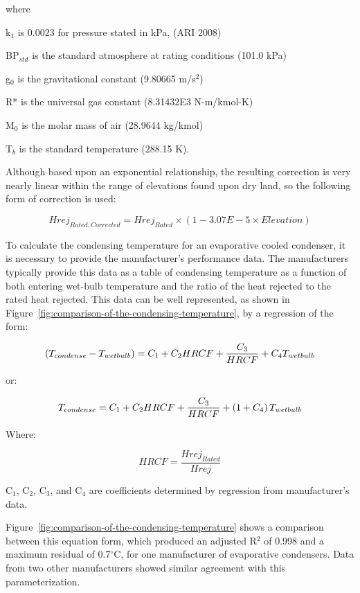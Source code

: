 where

k\(_{1}\) is 0.0023 for pressure stated in kPa, (ARI 2008)

BP\(_{std}\) is the standard atmosphere at rating conditions (101.0 kPa)

g\(_{0}\) is the gravitational constant (9.80665 m/s\(^{2}\))

R* is the universal gas constant (8.31432E3 N-m/kmol-K)

M\(_{0}\) is the molar mass of air (28.9644 kg/kmol)

T\(_{b}\) is the standard temperature (288.15 K).

Although based upon an exponential relationship, the resulting correction is very nearly linear within the range of elevations found upon dry land, so the following form of correction is used:

\begin{equation}
Hre{j_{Rated,Corrected}} = Hre{j_{Rated}} \times (1 - 3.07E - 5 \times Elevation)
\end{equation}

To calculate the condensing temperature for an evaporative cooled condenser, it is necessary to provide the manufacturer's performance data. The manufacturers typically provide this data as a table of condensing temperature as a function of both entering wet-bulb temperature and the ratio of the heat rejected to the rated heat rejected. This data can be well represented, as shown in Figure~\ref{fig:comparison-of-the-condensing-temperature}, by a regression of the form:

\begin{equation}
\left(T_{condense} - T_{wetbulb}\right) = {C_1} + {C_2}{HRCF} + \frac{C_3}{HRCF} + {C_4}{T_{wetbulb}}
\end{equation}

or:

\begin{equation}
T_{condense} = {C_1} + {C_2}{HRCF} + \frac{C_3}{HRCF} + \left(1 + C_4\right)T_{wetbulb}
\label{eq:TcondenseHRCFTwetbulb}
\end{equation}

Where:

\begin{equation}
HRCF = \frac{Hrej_{Rated}}{Hrej}
\end{equation}


C\(_{1}\), C\(_{2}\), C\(_{3}\), and C\(_{4}\) are coefficients determined by regression from manufacturer's data.

Figure~\ref{fig:comparison-of-the-condensing-temperature} shows a comparison between this equation form, which produced an adjusted R\(^{2}\) of 0.998 and a maximum residual of 0.7\(^{\circ}\)C, for one manufacturer of evaporative condensers. Data from two other manufacturers showed similar agreement with this parameterization.

